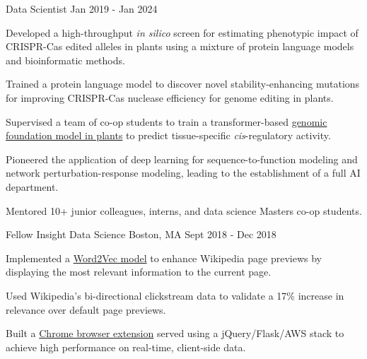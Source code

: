 \begin{cventries}
    \cventry
    {Data Scientist} %
    {} %
    {} %
    {Jan 2019 - Jan 2024} %
    {
      \begin{cvitems} %
        \item {Developed a high-throughput \textit{in silico} screen for estimating phenotypic impact of CRISPR-Cas edited alleles in plants using a mixture of protein language models and bioinformatic methods.}
        \item {Trained a protein language model to discover novel stability-enhancing mutations for improving CRISPR-Cas nuclease efficiency for genome editing in plants.}
        \item {Supervised a team of co-op students to train a transformer-based \href{https://assets-eu.researchsquare.com/files/rs-1927200/v1_covered.pdf}{genomic foundation model in plants} to predict tissue-specific \textit{cis}-regulatory activity.}
        \item {Pioneered the application of deep learning for sequence-to-function modeling and network perturbation-response modeling, leading to the establishment of a full AI department.}
        \item {Mentored 10+ junior colleagues, interns, and data science Masters co-op students.}
      \end{cvitems}
    }

  \cventry
    {Fellow} %
    {Insight Data Science} %
    {Boston, MA} %
    {Sept 2018 - Dec 2018} %
    {
      \begin{cvitems} %
        \item {Implemented a \href{https://github.com/knowbodynos/wikontext}{Word2Vec model} to enhance Wikipedia page previews by displaying the most relevant information to the current page.}
        \item {Used Wikipedia's bi-directional clickstream data to validate a 17\% increase in relevance over default page previews.}
        \item {Built a \href{https://www.wikontext.us/}{Chrome browser extension} served using a jQuery/Flask/AWS stack to achieve high performance on real-time, client-side data.}
      \end{cvitems}
    }


\end{cventries}
